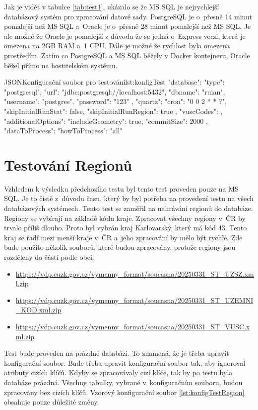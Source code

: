 Jak je vidět v tabulce \ref{tab:test1}, ukázalo se že MS SQL je nejrychlejší databázový systém pro zpracování datové sady.
PostgreSQL je o~přesně 14 minut pomalejší než MS SQL a~Oracle je o~přesně 28 minut pomalejší než MS SQL.
Je ale možné že Oracle je pomalejší z důvodu že se jedná o~Express verzi, která je omezena na 2GB RAM a~1 CPU.
Dále je možné že rychlost byla omezena prostředím. Zatím co PostgreSQL a MS SQL běžely v Docker kontejneru, 
Oracle běžel přímo na hostitelském systému.

\begin{code}{JSON}{Konfigurační soubor pro testování}{lst:konfigTest}
  {
    "database": {
      "type": "postgresql",
      "url": "jdbc:postgresql://localhost:5432",
      "dbname": "ruian",
      "username": "postgres",
      "password": "123"
    },
    "quartz": {
      "cron": "0 0 2 * * ?",
      "skipInitialRunStat": false,
      "skipInitialRunRegion": true
    },
    "vuscCodes": {},
    "additionalOptions": {
      "includeGeometry": true,
      "commitSize": 2000
    },
    "dataToProcess": {
      "howToProcess": "all"
    }
  }
\end{code}


\section{Testování Regionů}
Vzhledem k výsledku předchozího testu byl tento test proveden pouze na MS SQL.
Je to čistě z~důvodu času, který by byl potřeba na provedení testu na všech databázových systémech.
Tento test se zaměřil na nahrávání regionů do databáze.
Regiony se vybírají na základě kódu kraje. Zpracovat všechny regiony v~ČR by trvalo příliš dlouho.
Proto byl vybrán kraj Karlovarský, který má kód 43.
Tento kraj se řadí mezi menší kraje v~ČR a~jeho zpracování by mělo být rychlé.
Zde bude použito několik souborů, které budou zpracovány, protože regiony jsou rozděleny do částí podle obcí.
\begin{itemize}
  \item \url{https://vdp.cuzk.gov.cz/vymenny_format/soucasna/20250331_ST_UZSZ.xml.zip}
  \item \url{https://vdp.cuzk.gov.cz/vymenny_format/soucasna/20250331_ST_UZEMNI_KOD.xml.zip}
  \item \url{https://vdp.cuzk.gov.cz/vymenny_format/soucasna/20250331_ST_VUSC.xml.zip}
\end{itemize}

Test bude proveden na prázdné databázi. To znamená, že je třeba upravit konfigurační soubor.
Bude třeba upravit konfigurační soubor tak, aby ignoroval atributy cizích klíčů.
Kdyby se zpracovávaly cizí klíče, tak by po testu byla databáze prázdná.
Všechny tabulky, vybrané v~konfiguračním souboru, budou zpracovány bez cizích klíčů.
Vzorový konfigurační soubor \ref{lst:konfigTestRegion} obsahuje pouze důležité změny.

